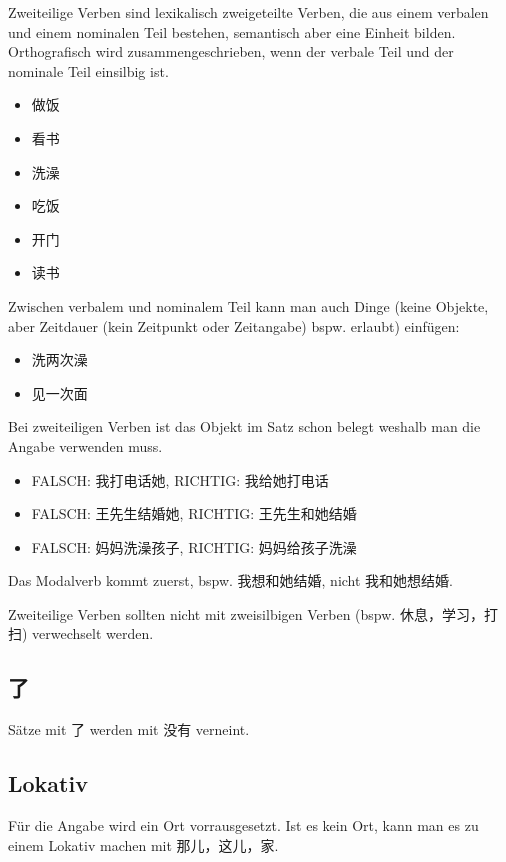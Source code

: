 \documentclass[UTF8]{ctexart}
\begin{document}
Zweiteilige Verben sind lexikalisch zweigeteilte Verben, die aus einem verbalen und einem nominalen Teil bestehen, semantisch aber eine Einheit bilden. Orthografisch wird zusammengeschrieben, wenn der verbale Teil und der nominale Teil
einsilbig ist.

\begin{itemize}
    \item 做饭
    \item 看书
    \item 洗澡
    \item 吃饭
    \item 开门
    \item 读书
\end{itemize}

Zwischen verbalem und nominalem Teil kann man auch Dinge (keine Objekte, aber Zeitdauer (kein Zeitpunkt oder Zeitangabe) bspw. erlaubt) einfügen:

\begin{itemize}
    \item 洗两次澡
    \item 见一次面
\end{itemize}

Bei zweiteiligen Verben ist das Objekt im Satz schon belegt weshalb man die Angabe verwenden muss.

\begin{itemize}
    \item FALSCH: 我打电话她, RICHTIG: 我给她打电话
    \item FALSCH: 王先⽣结婚她, RICHTIG: 王先⽣和她结婚
    \item FALSCH: 妈妈洗澡孩⼦, RICHTIG: 妈妈给孩⼦洗澡
\end{itemize}

Das Modalverb kommt zuerst, bspw. 我想和她结婚, nicht 我和她想结婚.

Zweiteilige Verben sollten nicht mit zweisilbigen Verben (bspw. 休息，学习，打扫) verwechselt werden.

\subsection{了}

Sätze mit 了 werden mit 没有 verneint.

\subsection{Lokativ}

Für die Angabe wird ein Ort vorrausgesetzt. Ist es kein Ort, kann man es zu einem Lokativ machen mit 那儿，这儿，家.
\end{document}
